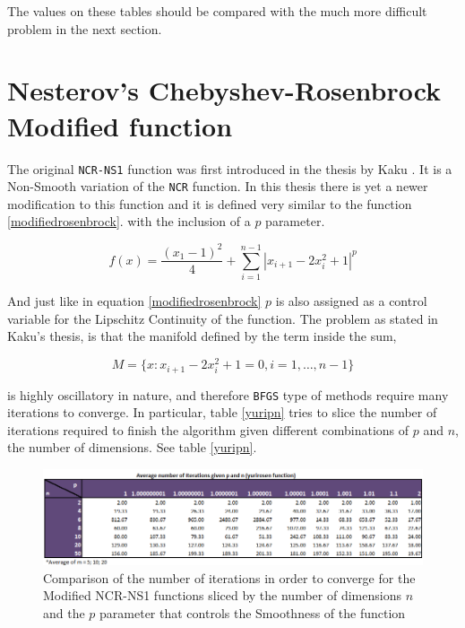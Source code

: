 The values on these tables should be compared with the much more difficult problem in the next section.

\section{Nesterov's Chebyshev-Rosenbrock Modified function}
The original \texttt{NCR-NS1} function was first introduced in the thesis by Kaku \citep{kaku}. It is a Non-Smooth variation of the \texttt{NCR} function. In this thesis there is yet a newer modification to this function and it is defined very similar to the function \eqref{modifiedrosenbrock}. with the inclusion of a $p$ parameter.

\begin{equation} \label{modifiedyurirosen}
    f(x) = \frac{(x_1 - 1)^2}{4} + \sum_{i = 1}^{n-1} |x_{i+1} - 2x_{i}^2 + 1|^p
\end{equation}

And just like in equation \eqref{modifiedrosenbrock} $p$ is also assigned as a control variable for the Lipschitz Continuity of the function. The problem as stated in Kaku's thesis, is that the manifold defined by the term inside the sum,

\begin{equation} \label{kakumanifold}
    M = \{x: x_{i+1} - 2x_i^2 + 1 = 0, i = 1, \hdots, n-1 \}
\end{equation}

is highly oscillatory in nature, and therefore \texttt{BFGS} type of methods require many iterations to converge. In particular, table \eqref{yuripn} tries to slice the number of iterations required to finish the algorithm given different combinations of $p$ and $n$, the number of dimensions. See table \eqref{yuripn}.

\begin{figure}
\begin{center}
\includegraphics[scale=0.6]{Figures/yurirosenpn.PNG}
\caption[Comparison of selected values of the Modified NCR-NS1 function pivoting by p and n parameters]{Comparison of the number of iterations in order to converge for the Modified NCR-NS1 functions sliced by the number of dimensions $n$ and the $p$ parameter that controls the Smoothness of the function}
\label{yuripn}
\end{center}
\end{figure} 

